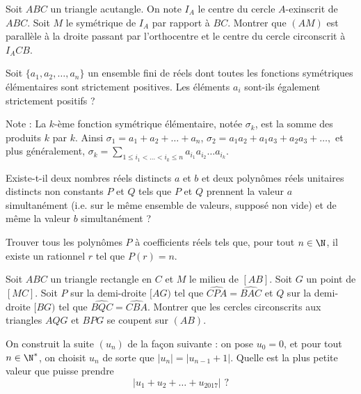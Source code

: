 \begin{exo}{}
Soit $ABC$ un triangle acutangle. On note $I_A$ le centre du cercle $A$-exinscrit de $ABC$. Soit $M$ le symétrique de $I_A$ par rapport à $BC$. Montrer que $(AM)$ est parallèle à la droite passant par l'orthocentre et le centre du cercle circonscrit à $I_ACB$.

\end{exo}



\begin{exo}{}
Soit $\{a_1, a_2, \ldots, a_n\}$ un ensemble fini de réels dont toutes les fonctions symétriques élémentaires sont strictement positives. Les éléments $a_i$ sont-ils également strictement positifs ?

Note : La $k$-ème fonction symétrique élémentaire, notée $\sigma_k$, est la somme des produits $k$ par $k$. Ainsi
$\sigma_1 = a_1 + a_2 + \ldots+a_n$, $
\sigma_2 = a_1a_2 + a_1a_3 + a_2a_3 + \ldots ,$ et plus généralement, $\sigma_k = \sum_{1\leq i_1 < \ldots < i_k \leq n} a_{i_1}a_{i_2}\ldots a_{i_k}$.
\end{exo}

\begin{exo}{}
Existe-t-il deux nombres réels distincts $a$ et $b$ et deux polynômes réels unitaires distincts non constants $P$ et $Q$ tels que $P$ et $Q$ prennent la valeur $a$ simultanément (i.e. sur le même ensemble de valeurs, supposé non vide) et de même la valeur $b$ simultanément ?
\end{exo}


\begin{exo}{}
Trouver tous les polynômes $P$ à coefficients réels tels que, pour tout $n \in \N$, il existe un rationnel $r$ tel que $P(r)=n$.
\end{exo}


\begin{exo}{}
Soit $ABC$ un triangle rectangle en $C$ et $M$ le milieu de $[AB]$. Soit $G$ un point de $[MC]$. Soit $P$ sur la demi-droite $[AG)$ tel que $\widehat{CPA}=\widehat{BAC}$ et $Q$ sur la demi-droite $[BG)$ tel que $\widehat{BQC}=\widehat{CBA}$. Montrer que les cercles circonscrits aux triangles $AQG$ et $BPG$ se coupent sur $(AB)$.
\end{exo}

\begin{exo}{}
On construit la suite $(u_n)$ de la façon suivante : on pose $u_0=0$, et pour tout $n\in \N^*$, on choisit $u_n$ de sorte que $\vert u_n\vert = \vert u_{n-1}+1\vert$. Quelle est la plus petite valeur que puisse prendre
$$\vert u_1+u_2+\ldots+u_{2017}\vert \, \, ?$$
\end{exo}

